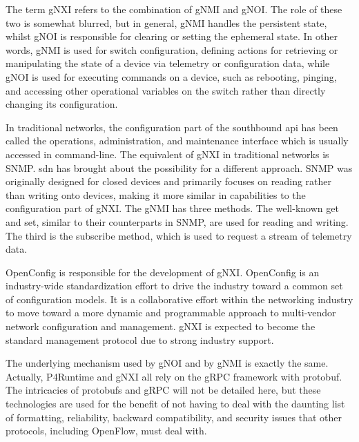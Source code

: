 The term gNXI refers to the combination of gNMI and gNOI. The role of these two is somewhat blurred, but in general, gNMI handles the persistent state, whilst gNOI is responsible for clearing or setting the ephemeral state. In other words, gNMI is used for switch configuration, defining actions for retrieving or manipulating the state of a device via telemetry or configuration data, while gNOI is used for executing commands on a device, such as rebooting, pinging, and accessing other operational variables on the switch rather than directly changing its configuration\cite{peterson_software-defined_2021}\cite{noauthor_openconfig_nodate}.

In traditional networks, the configuration part of the southbound api has been called the operations, administration, and maintenance interface which is usually accessed in command-line\cite{peterson_software-defined_2021}. The equivalent of gNXI in traditional networks is SNMP. \gls{sdn} has brought about the possibility for a different approach. SNMP was originally designed for closed devices and primarily focuses on reading rather than writing onto devices, making it more similar in capabilities to the configuration part of gNXI\cite{peterson_software-defined_2021}.
The gNMI has three methods. The well-known get and set, similar to their counterparts in SNMP, are used for reading and writing. The third is the subscribe method, which is used to request a stream of telemetry data\cite{peterson_software-defined_2021}.

OpenConfig is responsible for the development of gNXI. OpenConfig is an industry-wide standardization effort to drive the industry toward a common set of configuration models. It is a collaborative effort within the networking industry to move toward a more dynamic and programmable approach to multi-vendor network configuration and management. gNXI is expected to become the standard management protocol due to strong industry support\cite{peterson_software-defined_2021}.

The underlying mechanism used by gNOI and by gNMI is exactly the same\cite{peterson_software-defined_2021}. Actually, P4Runtime and gNXI all rely on the gRPC framework with protobuf\cite{hauser_survey_2021}. The intricacies of protobufs and gRPC will not be detailed here, but these technologies are used for the benefit of not having to deal with the daunting list of formatting, reliability, backward compatibility, and security issues that other protocols, including OpenFlow, must deal with\cite{peterson_software-defined_2021}.

